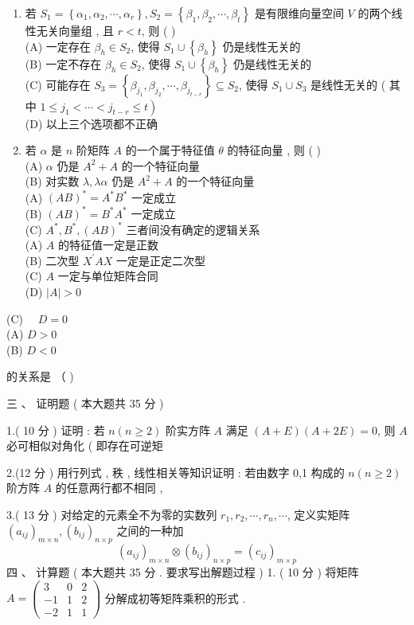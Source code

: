 \documentclass[10pt]{article}
\begin{document}
{\begin{enumerate}
  \item  若  $S_{1}=\left\{\alpha_{1}, \alpha_{2}, \cdots, \alpha_{r}\right\}, S_{2}=\left\{\beta_{1}, \beta_{2}, \cdots, \beta_{t}\right\}$  是有限维向量空间  $V$  的两个线性无关向量组 ,  且  $r<t$,  则  ( )\\
(A)  一定存在  $\beta_{h} \in S_{2}$,  使得  $S_{1} \cup\left\{\beta_{h}\right\}$  仍是线性无关的 \\
(B)  一定不存在  $\beta_{h} \in S_{2}$,  使得  $S_{1} \cup\left\{\beta_{h}\right\}$  仍是线性无关的 \\
(C)  可能存在  $S_{3}=\left\{\beta_{j_{1}}, \beta_{j_{2}}, \cdots, \beta_{j_{t-r}}\right\} \subseteq S_{2}$,  使得  $S_{1} \cup S_{3}$  是线性无关的 ( 其中  $\left.1 \leq j_{1}<\cdots<j_{t-r} \leq t\right)$\\
(D)  以上三个选项都不正确 

  \item  若  $\alpha$  是  $n$  阶矩阵  $A$  的一个属于特征值  $\theta$  的特征向量 ,  则 ( )\\
(A) $\alpha$  仍是  $A^{2}+A$  的一个特征向量 \\
(B)  对实数  $\lambda, \lambda \alpha$  仍是  $A^{2}+A$  的一个特征向量 \\
(A) $(A B)^{*}=A^{*} B^{*}$  一定成立 \\
(B) $(A B)^{*}=B^{*} A^{*}$  一定成立 \\
(C) $A^{*}, B^{*},(A B)^{*}$  三者间没有确定的逻辑关系 \\
(A) $A$  的特征值一定是正数 \\
(B)  二次型  $X^{\prime} A X$  一定是正定二次型 \\
(C) $A$  一定与单位矩阵合同 \\
(D) $|A|>0$

\end{enumerate}
(C) $\quad D=0$\\
(A) $D>0$\\
(B) $D<0$

 的关系是 （ )

 三 、 证明题 ( 本大题共  35  分 )

1.( 10  分 )  证明 :  若  $n(n \geq 2)$  阶实方阵  $A$  满足  $(A+E)(A+2 E)=0$,  则  $A$  必可相似对角化 ( 即存在可逆矩 

2.(12  分 )  用行列式 ,  秩 ,  线性相关等知识证明 :  若由数字  0,1  构成的  $n(n \geq 2)$  阶方阵  $A$  的任意两行都不相同 ,

3.( 13  分 )  对给定的元素全不为零的实数列  $r_{1}, r_{2}, \cdots, r_{n}, \cdots$,  定义实矩阵  $\left(a_{i j}\right)_{m \times n},\left(b_{i j}\right)_{n \times p}$  之间的一种加 
$$
\left(a_{i j}\right)_{m \times n} \otimes\left(b_{i j}\right)_{n \times p}=\left(c_{i j}\right)_{m \times p}
$$
 四 、 计算题 ( 本大题共  35  分 .  要求写出解题过程 ) 1. ( 10  分 )  将矩阵  $A=\left(\begin{array}{ccc}3 & 0 & 2 \\ -1 & 1 & 2 \\ -2 & 1 & 1\end{array}\right)$  分解成初等矩阵乘积的形式 .

}
\end{document}

